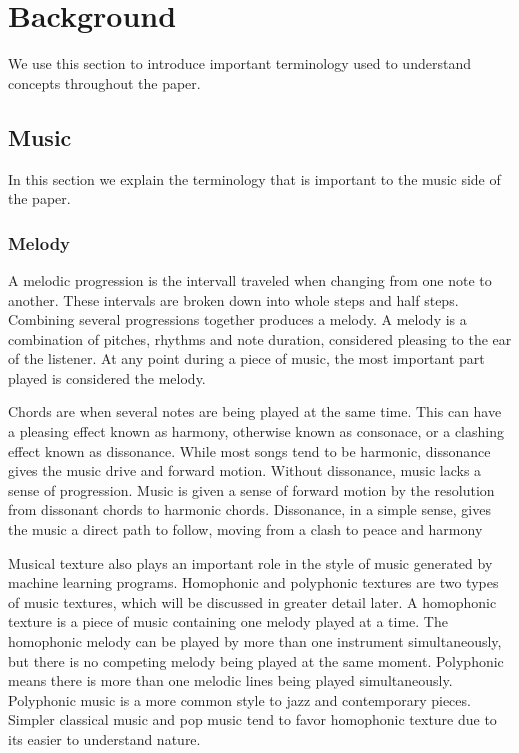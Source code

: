 \documentclass{sig-alternate}
\begin{document}
\section{Background}
\label{sec:background}
	We use this section to introduce important terminology used to understand concepts throughout the paper. 

\subsection{Music}
\label{sec:music}
	In this section we explain the terminology that is important to the music side of the paper.
\subsubsection{Melody}
\label{sec:melody}
A melodic progression is the intervall traveled when changing from one note to another. These intervals are broken down into whole steps and half steps. Combining several progressions together produces a melody. A melody is a combination of pitches, rhythms and note duration, considered pleasing to the ear of the listener. At any point during a piece of music, the most important part played is considered the melody. 

Chords are when several notes are being played at the same time. This can have a pleasing effect known as harmony, otherwise known as consonace, or a clashing effect known as dissonance. While most songs tend to be harmonic, dissonance gives the music drive and forward motion. Without dissonance, music lacks a sense of progression. Music is given a sense of forward motion by the resolution from dissonant chords to harmonic chords. Dissonance, in a simple sense, gives the music a direct path to follow, moving from a clash to peace and harmony

Musical texture also plays an important role in the style of music generated by machine learning programs. Homophonic and polyphonic textures are two types of music textures, which will be discussed in greater detail later. A homophonic texture is a piece of music containing one melody played at a time. The homophonic melody can be played by more than one instrument simultaneously, but there is no competing melody being played at the same moment. Polyphonic means there is more than one melodic lines being played simultaneously. Polyphonic music is a more common style to jazz and contemporary pieces. Simpler classical music and pop music tend to favor homophonic texture due to its easier to understand nature.
\end{document}
